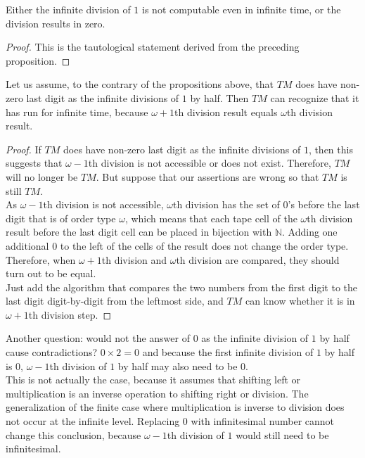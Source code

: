 \documentclass{roffin}
\begin{document}
\begin{proposition}
Either the infinite division of $1$ is not computable even in infinite time, or the division results in zero.
\end{proposition}
\begin{proof}
This is the tautological statement derived from the preceding proposition.
\end{proof}
\begin{proposition}
Let us assume, to the contrary of the propositions above, that $TM$ does have non-zero last digit as the infinite divisions of $1$ by half. Then $TM$ can recognize that it has run for infinite time, because $\omega+1$th division result equals $\omega$th division result.
\end{proposition}
\begin{proof}
If $TM$ does have non-zero last digit as the infinite divisions of $1$, then this suggests that $\omega - 1$th division is not accessible or does not exist. Therefore, $TM$ will no longer be $TM$. But suppose that our assertions are wrong so that $TM$ is still $TM$.\\
As $\omega -1$th division is not accessible, $\omega$th division has the set of $0$'s before the last digit that is of order type $\omega$, which means that each tape cell of the $\omega$th division result before the last digit cell can be placed in bijection with $\mathbb{N}$. Adding one additional $0$ to the left of the cells of the result does not change the order type. Therefore, when $\omega+1$th division and $\omega$th division are compared, they should turn out to be equal.\\
Just add the algorithm that compares the two numbers from the first digit to the last digit digit-by-digit from the leftmost side, and $TM$ can know whether it is in $\omega+1$th division step. 
\end{proof}
Another question: would not the answer of $0$ as the infinite division of $1$ by half cause contradictions? $0 \times 2 = 0$ and because the first infinite division of $1$ by half is $0$, $\omega -1$th division of $1$ by half may also need to be $0$.\\
This is not actually the case, because it assumes that shifting left or multiplication is an inverse operation to shifting right or division. The generalization of the finite case where multiplication is inverse to division does not occur at the infinite level. Replacing $0$ with infinitesimal number cannot change this conclusion, because $\omega -1$th division of $1$ would still need to be infinitesimal.\\
\end{document}
